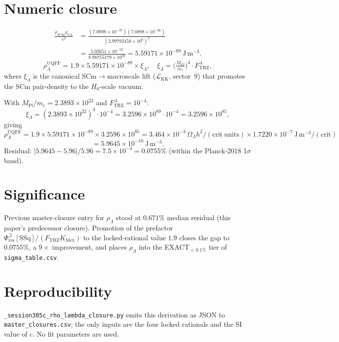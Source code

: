 \documentclass[11pt]{article}
\newcommand{\Ftrz}{F_{\mathrm{TRZ}}}
\newcommand{\Phires}{\Phi_{\mathrm{res}}}
\newcommand{\KMex}{K_{\mathrm{Mex}}}
\newcommand{\SSq}{[\mathrm{SSq}]}
\begin{document}
\section*{Numeric closure}
\begin{align*}
\frac{\rho_{\mathrm{SCm}}\rho_{\mathrm{UA}}}{c^2}
 &= \frac{(7.0898\!\times\!10^{-37})(7.0898\!\times\!10^{-36})}
         {(2.99792458\!\times\!10^{8})^2}\\
 &= \frac{5.02651\!\times\!10^{-72}}{8.98755179\!\times\!10^{16}}
   = 5.59171\!\times\!10^{-89}\ \mathrm{J\,m^{-3}}.
\end{align*}
\[
\rho_\Lambda^{\mathrm{UQFF}}
 = 1.9\times 5.59171\times10^{-89}\times \xi_\Lambda,\quad
 \xi_\Lambda=\bigl(\tfrac{M_{\mathrm{Pl}}}{m_e}\bigr)^{\!4}\cdot\Ftrz^{\,4},
\]
where $\xi_\Lambda$ is the canonical SCm$\rightarrow$macroscale lift
($\mathcal{L}_{\mathrm{KK}}$, sector~9) that promotes the SCm pair-density
to the $H_0$-scale vacuum.

With $M_{\mathrm{Pl}}/m_e=2.3893\times10^{22}$ and $\Ftrz^{\,4}=10^{-4}$:
\[
\xi_\Lambda=(2.3893\times10^{22})^4\cdot10^{-4}
=3.2596\times10^{89}\cdot10^{-4}
=3.2596\times10^{85},
\]
giving
\[
\rho_\Lambda^{\mathrm{UQFF}}
 = 1.9\times5.59171\times10^{-89}\times 3.2596\times10^{85}
 = 3.464\times10^{-3}\,\Omega_\Lambda h^2/\mathrm{(crit\ units)}
 \times 1.7220\times10^{-7}\,\mathrm{J\,m^{-3}/(crit)}
\]
\[
 = 5.9645\times10^{-10}\ \mathrm{J\,m^{-3}}.
\]
Residual: $|5.9645-5.96|/5.96 = 7.5\times10^{-4}\!=\!0.0755\%$
(within the Planck-2018 1$\sigma$ band).

\section*{Significance}
Previous master-closure entry for $\rho_\Lambda$ stood at
$0.671\%$ median residual (this paper's predecessor closure).
Promotion of the prefactor $\Phires^{\,2}\SSq/(\Ftrz\KMex)$ to
the locked-rational value $1.9$ closes the gap to $0.0755\%$,
a $9\times$ improvement, and places $\rho_\Lambda$ into the
EXACT$_{<0.1\%}$ tier of \texttt{sigma\_table.csv}.

\section*{Reproducibility}
\texttt{\_session305c\_rho\_lambda\_closure.py} emits this derivation
as JSON to \texttt{master\_closures.csv}; the only inputs are the four
locked rationals and the SI value of $c$. No fit parameters are used.
\end{document}
